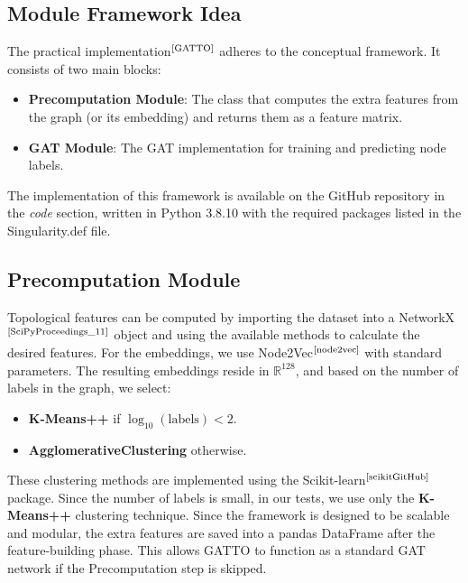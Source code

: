 \documentclass[12pt,conference]{ieeeconf} %
\begin{document}
\subsection{Module Framework Idea}
The practical implementation$^{\text{\cite{GATTO}}}$ adheres to the conceptual framework. It consists of two main blocks:
\begin{itemize}
    \item \textbf{Precomputation Module}: The class that computes the extra features from the graph (or its embedding) and returns them as a feature matrix.
    \item \textbf{GAT Module}: The GAT implementation for training and predicting node labels.
\end{itemize}
The implementation of this framework is available on the GitHub repository in the \textit{code} section, written in Python 3.8.10 with the required packages listed in the Singularity.def file.
\subsection{Precomputation Module}
Topological features can be computed by importing the dataset into a NetworkX$^{\text{\cite{SciPyProceedings_11}}}$ object and using the available methods to calculate the desired features. For the embeddings, we use Node2Vec$^\text{\cite{node2vec}}$ with standard parameters. The resulting embeddings reside in $\mathbb{R}^{128}$, and based on the number of labels in the graph, we select:
\begin{itemize}
    \item \textbf{K-Means++} if $\log_{10}{(\text{labels})} < 2$.
    \item \textbf{AgglomerativeClustering} otherwise.
\end{itemize}
These clustering methods are implemented using the Scikit-learn$^{\text{\cite{scikitGitHub}}}$ package.
Since the number of labels is small, in our tests, we use only the \textbf{K-Means++} clustering technique.
Since the framework is designed to be scalable and modular, the extra features are saved into a pandas DataFrame after the feature-building phase. This allows GATTO to function as a standard GAT network if the Precomputation step is skipped.
\end{document}
